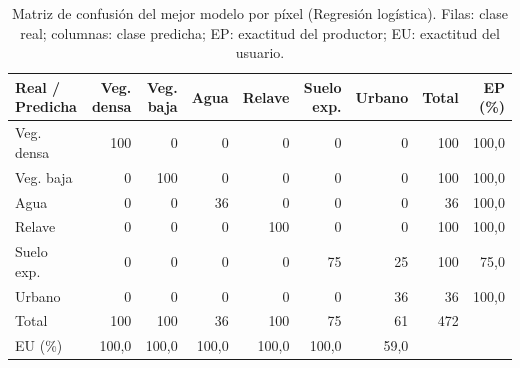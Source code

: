 \begin{table}[htbp]
 \centering
 \small
\setlength{\tabcolsep}{3.5pt}
 \caption{Matriz de confusión del mejor modelo por píxel (Regresión logística). Filas: clase real; columnas: clase predicha; EP: exactitud del productor; EU: exactitud del usuario.}
 \label{tab:matriz_mejor}
 \begin{tabular}{lrrrrrrrr}
  \toprule
  Real / Predicha & Veg. densa & Veg. baja & Agua & Relave & Suelo exp. & Urbano & Total & EP (\%) \\
  \midrule
  Veg. densa & 100 & 0 & 0 & 0 & 0 & 0 & 100 & 100{,}0 \\
  Veg. baja & 0 & 100 & 0 & 0 & 0 & 0 & 100 & 100{,}0 \\
  Agua & 0 & 0 & 36 & 0 & 0 & 0 & 36 & 100{,}0 \\
  Relave & 0 & 0 & 0 & 100 & 0 & 0 & 100 & 100{,}0 \\
  Suelo exp. & 0 & 0 & 0 & 0 & 75 & 25 & 100 & 75{,}0 \\
  Urbano & 0 & 0 & 0 & 0 & 0 & 36 & 36 & 100{,}0 \\
  \midrule
  Total & 100 & 100 & 36 & 100 & 75 & 61 & 472 & \\
  EU (\%) & 100{,}0 & 100{,}0 & 100{,}0 & 100{,}0 & 100{,}0 & 59{,}0 & & \\
  \bottomrule
 \end{tabular}
\end{table}
